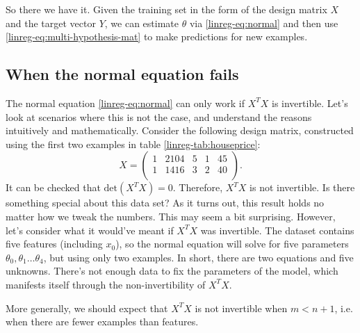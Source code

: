 \documentclass{article}
\theoremstyle{definition}
\begin{document}
So there we have it. Given the training set in the form of the design matrix $X$ and the target vector $Y$, we can estimate $\theta$ via \eqref{linreg-eq:normal} and then use \eqref{linreg-eq:multi-hypothesis-mat} to make predictions for new examples.

\subsection{When the normal equation fails}
The normal equation \eqref{linreg-eq:normal} can only work if $X^TX$ is invertible. Let's look at scenarios where this is not the case, and understand the reasons intuitively and mathematically. Consider the following design matrix, constructed using the first two examples in table \ref{linreg-tab:houseprice}:
\begin{equation}
    X =
    \begin{pmatrix}
        1 & 2104 & 5 & 1 & 45 \\
        1 & 1416 & 3 & 2 & 40 \\
    \end{pmatrix}.
\end{equation}
It can be checked that $\text{det}(X^TX)=0$. Therefore, $X^TX$ is not invertible. Is there something special about this data set? As it turns out, this result holds no matter how we tweak the numbers. This may seem a bit surprising. However, let's consider what it would've meant if $X^TX$ was invertible. The dataset contains five features (including $x_0$), so the normal equation will solve for five parameters $\theta_0,\theta_1\dots\theta_4$, but using only two examples. In short, there are two equations and five unknowns. There's not enough data to fix the parameters of the model, which manifests itself through the non-invertibility of $X^TX$.

More generally, we should expect that $X^TX$ is not invertible when $m<n+1$, i.e. when there are fewer examples than features.
\end{document}
